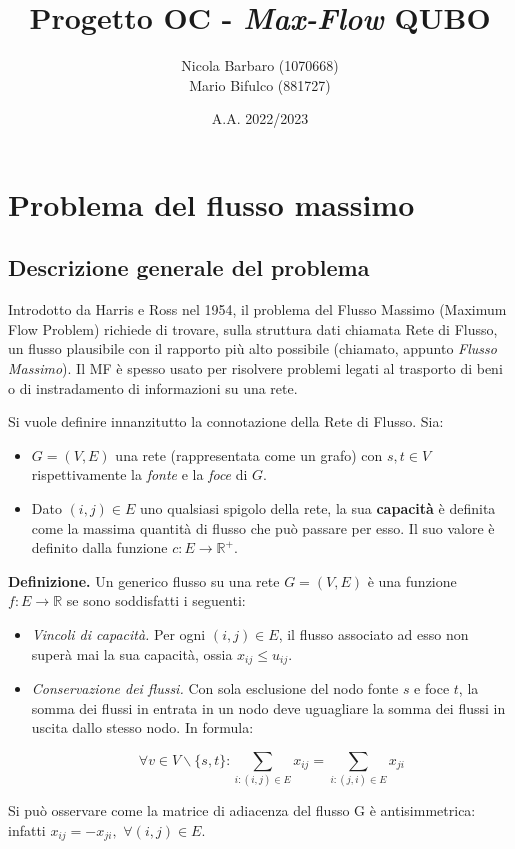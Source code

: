 \documentclass{article}
\author{Nicola Barbaro (1070668)\\Mario Bifulco (881727)}
\title{Progetto OC - \emph{Max-Flow} QUBO}
\date{A.A. 2022/2023}
\begin{document}
\maketitle
\tableofcontents
\pagebreak

\section{Problema del flusso massimo}

\subsection{Descrizione generale del problema}
Introdotto da Harris e Ross nel 1954, il problema del Flusso Massimo (Maximum Flow Problem) richiede di trovare, sulla struttura dati chiamata Rete di Flusso, un
flusso plausibile con il rapporto più alto possibile (chiamato, appunto \emph{Flusso Massimo}). Il MF è spesso usato per risolvere problemi legati al trasporto di beni o di 
instradamento di informazioni su una rete.

Si vuole definire innanzitutto la connotazione della Rete di Flusso. Sia:
\begin{itemize}
    \item $G = (V, E)$ una rete (rappresentata come un grafo) con $s, t \in V$ rispettivamente la \emph{fonte} e la \emph{foce} di $G$.
    \item Dato $(i, j) \in E$ uno qualsiasi spigolo della rete, la sua \textbf{capacità} è definita come la massima quantità di flusso che può passare per esso. 
    Il suo valore è definito dalla funzione $c : E \rightarrow \mathbb{R}^+$.
\end{itemize}

\textbf{Definizione.} Un generico flusso su una rete $G = (V, E)$ è una funzione $f : E \rightarrow \mathbb{R}$ se sono soddisfatti i seguenti:
\begin{itemize}
    \item \emph{Vincoli di capacità.} Per ogni $(i, j) \in E$, il flusso associato ad esso non superà mai la sua capacità, ossia $x_{ij} \leq u_{ij}$.
    \item \emph{Conservazione dei flussi.} Con sola esclusione del nodo fonte $s$ e foce $t$, la somma dei flussi in entrata in un nodo deve uguagliare la somma dei flussi in uscita
    dallo stesso nodo. In formula:

    \[ \forall v \in V \backslash \{s,t\}: \sum_{i: (i, j) \in E} x_{ij} = \sum_{i: (j,i) \in E} x_{ji}\]
\end{itemize}
Si può osservare come la matrice di adiacenza del flusso G è antisimmetrica: infatti $x_{ij} = -x_{ji},$ $\forall (i, j) \in E$.
\end{document}

